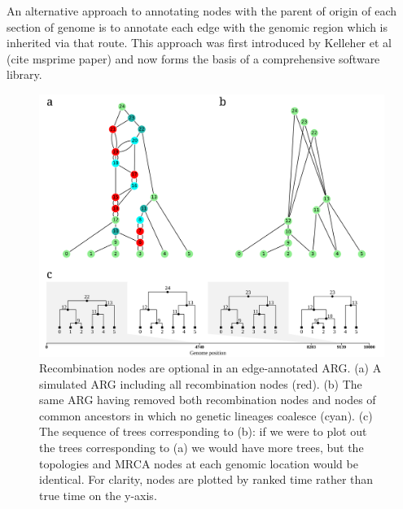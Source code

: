 \documentclass{article}
\begin{document}
An alternative approach to annotating nodes with the parent of origin of each
section of genome is to annotate each edge with the genomic region which is
inherited via that route. This approach was first introduced by Kelleher et al
(cite msprime paper) and now forms the basis of a comprehensive software
library.


\begin{figure}
\centering
\vspace{5em}
\includegraphics[width=\linewidth]{illustrations/ARG_recomb_node_deletion}
\caption{\label{fig-recombinati on-nodes}
Recombination nodes are optional in an edge-annotated ARG. (a) A simulated
ARG including all recombination nodes (red). (b) The same ARG having removed both
recombination nodes and nodes of common ancestors in which no genetic
lineages coalesce (cyan). (c) The sequence of trees corresponding to (b): if we were
to plot out the trees corresponding to (a) we would have more trees, but the topologies
and MRCA nodes at each genomic location would be identical. For clarity, nodes are
plotted by ranked time rather than true time on the y-axis.
}
\end{figure}
\end{document}
